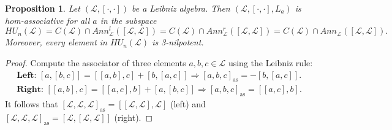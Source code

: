 \documentclass[12pt]{article}
\newtheorem{proposition}[theorem]{Proposition}
\begin{document}
            \begin{proposition}\label{prop:LeibHomUnities}
				Let $(\mathcal{L},[\cdot,\cdot])$ be a Leibniz algebra. Then $(\mathcal{L},[\cdot,\cdot],L_a)$ is hom-associative for all $a$ in the subspace
				\begin{equation*}
					HU_n(\mathcal{L})=C(\mathcal{L})\cap Ann_\mathcal{L}^l([\mathcal{L},\mathcal{L}])=C(\mathcal{L})\cap Ann_\mathcal{L}^r([\mathcal{L},\mathcal{L}])=C(\mathcal{L})\cap Ann_\mathcal{L}([\mathcal{L},\mathcal{L}]).
				\end{equation*}
				Moreover, every element in $HU_n(\mathcal{L})$ is 3-nilpotent.
			\end{proposition}
			
			\begin{proof}
				Compute the associator of three elements $a,b,c\in\mathcal{L}$ using the Leibniz rule:
				\begin{align*}
					\textbf{Left: }[a,[b,c]]=[[a,b],c]+[b,[a,c]]\Rightarrow [a,b,c]_{\mathrm{as}}=-[b,[a,c]].\\
					\textbf{Right: }[[a,b],c]=[[a,c],b]+[a,[b,c]]\Rightarrow [a,b,c]_{\mathrm{as}}=[[a,c],b].
				\end{align*}
				It follows that $[\mathcal{L},\mathcal{L},\mathcal{L}]_{\mathrm{as}}=[[\mathcal{L},\mathcal{L}],\mathcal{L}]$ (left) and $[\mathcal{L},\mathcal{L},\mathcal{L}]_{\mathrm{as}}=[\mathcal{L},[\mathcal{L},\mathcal{L}]]$ (right).
				

\end{proof}
\end{document}
